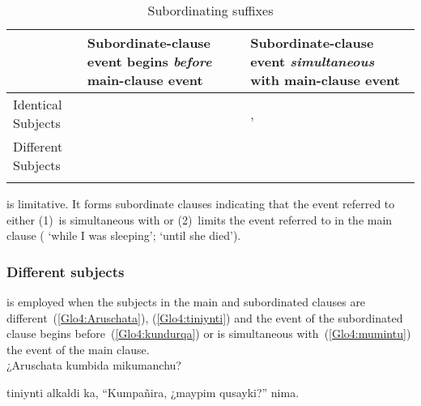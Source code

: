 \begin{table}[!ht]
\small\centering
\caption{Subordinating suffixes}\label{Tab24}
\begin{tabularx}{\textwidth}{lLL}
\lsptoprule
&Subordinate-clause event begins \emph{before} main-clause event & Subordinate-clause event \emph{simultaneous} with main-clause event		\\
\midrule
Identical Subjects	& 		& , 	\\
Different Subjects	& 		& 					\\
\lspbottomrule
\end{tabularx}
\end{table}

 is limitative. It forms subordinate clauses indicating that the event referred to either (1)~is simultaneous with or (2)~limits the event referred to in the main clause ( ‘while I was sleeping’;  ‘until she died’). 

\subsubsection{Different subjects }
 is employed when the subjects in the main and subordinated clauses are different~(\ref{Glo4:Aruschata}), (\ref{Glo4:tiniynti}) and the event of the subordinated clause begins before~(\ref{Glo4:kundurqa}) or is simultaneous with~(\ref{Glo4:mumintu}) the event of the main clause.\\

%
{¿Aruschata kumbida mikumanchu?}%
{}%
{}{}%

%
{ tiniynti alkaldi ka, “Kumpañira, ¿maypim qusayki?” nima.}%
{}%
{}{}%

